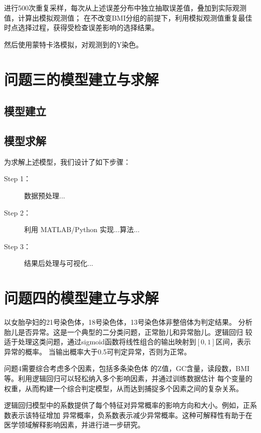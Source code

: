 \documentclass[withoutpreface,notoc]{cumcmthesis}
\begin{document}
进行500次重复采样，每次从上述误差分布中独立抽取误差值，叠加到实际观测值，计算出模拟观测值；
在不改变BMI分组的前提下，利用模拟观测值重复最佳时点选择过程，获得受检查误差影响的选择结果。

然后使用蒙特卡洛模拟，对观测到的Y染色。



	\section{问题三的模型建立与求解}

	\subsection{模型建立}
	\subsection{模型求解}
	为求解上述模型，我们设计了如下步骤：
	
	\begin{description}
		\item[Step 1：] 数据预处理...
		\item[Step 2：] 利用 MATLAB/Python 实现...算法...
		\item[Step 3：] 结果后处理与可视化...
	\end{description}


















	\section{问题四的模型建立与求解}

	以女胎孕妇的21号染色体，18号染色体，13号染色体非整倍体为判定结果。
	分析胎儿是否异常。这是一个典型的二分类问题，正常胎儿和异常胎儿。逻辑回归
	较适于处理这类问题，通过sigmoid函数将线性组合的输出映射到$[0,1]$区间，表示异常的概率。
	当输出概率大于0.5可判定异常，否则为正常。
	
	问题4需要综合考虑多个因素，包括多条染色体
	的Z值，GC含量，读段数，BMI等。利用逻辑回归可以轻松纳入多个影响因素，并通过训练数据估计
	每个变量的权重，从而构建一个综合判定模型，从而达到捕捉多个因素之间的复杂关系。

	逻辑回归模型中的系数提供了每个特征对异常概率的影响方向和大小。例如，正系数表示该特征增加
	异常概率，负系数表示减少异常概率。这种可解释性有助于在医学领域解释影响因素，并进行进一步研究。
\end{document}
